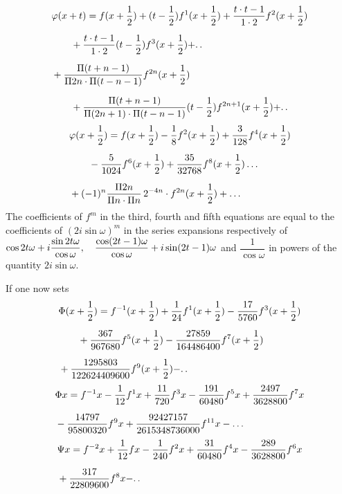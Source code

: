 \[
\begin{aligned}
&\varphi(x+t)={}f(x+\frac12)+(t-\frac12)f^{1}(x+\frac12)
+\frac{t\cdot t-1}{1\cdot2}f^{2}(x+\frac12)
\\[6pt]
&\qquad{}+\frac{t\cdot t-1}{1\cdot2}(t-\frac12)f^{3}(x+\frac12)+\ldotp\ldotp\\[6pt]
&+\frac{\Pi(t+n-1)}{\Pi 2n\cdot\Pi(t-n-1)}f^{2n}(x+\frac12)
\\[6pt]
&\qquad{}+\frac{\Pi(t+n-1)}{\Pi(2n+1)\cdot\Pi(t-n-1)}(t-\frac12)f^{2n+1}(x+\frac12)+\ldotp\ldotp
\end{aligned}
\]
\[
\begin{aligned}
&\varphi(x+\frac12)={}f(x+\frac12)-\frac18f^{2}(x+\frac12)
+\frac{3}{128}f^{4}(x+\frac12)\\[6pt]
&\qquad{}-\frac{5}{1024}f^{6}(x+\frac12)
+\frac{35}{32768}f^{8}(x+\frac12)\mathinner{.\,.\,.}\\[6pt]
&+(-1)^n\frac{\Pi 2n}{\Pi n\cdot\Pi n}\,2^{-4n}\cdot f^{2n}(x+\frac12)+\mathinner{.\,.\,.}
\end{aligned}
\]
The coefficients of $f^m$ in the third, fourth and fifth equations are equal to the coefficients of
$(2i\sin\omega)^m$ in the series expansions respectively of
$\cos 2t\omega+i\dfrac{\sin 2t\omega}{\cos\omega},\allowbreak{}\allowbreak \quad
\dfrac{\cos(2t-\nobreak{}1)\omega}{\cos\omega}+i\sin(2t-\nobreak{}1)\omega$
and $\dfrac{1}{\cos\omega}$ in powers of the quantity $2i\sin\omega$.
\par{}
If one now sets
\[
\begin{aligned}
&\Phi(x+\frac12)={}f^{-1}(x+\frac12)+\frac{1}{24}f^{1}(x+\frac12)
-\frac{17}{5760}f^{3}(x+\frac12)\\[6pt]
&\qquad{}+\frac{367}{967680}f^{5}(x+\frac12)
-\frac{27859}{164486400}f^{7}(x+\frac12)\\[6pt]
&+\frac{1295803}{122624409600}f^{9}(x+\frac12)-\ldotp\ldotp
\end{aligned}
\]
\[
\begin{aligned}
&\Phi x={}f^{-1}x-\frac{1}{12}f^{1}x+\frac{11}{720}f^{3}x
-\frac{191}{60480}f^{5}x+\frac{2497}{3628800}f^{7}x\\[6pt]
&-\frac{14797}{95800320}f^{9}x+\frac{92427157}{2615348736000}f^{11}x-\mathinner{.\,.\,.}
\end{aligned}
\]
\[
\begin{aligned}
&\Psi x={}f^{-2}x+\frac{1}{12}fx-\frac{1}{240}f^{2}x
+\frac{31}{60480}f^{4}x-\frac{289}{3628800}f^{6}x\\[6pt]
&+\frac{317}{22809600}f^{8}x-\ldotp\ldotp
\end{aligned}
\]
